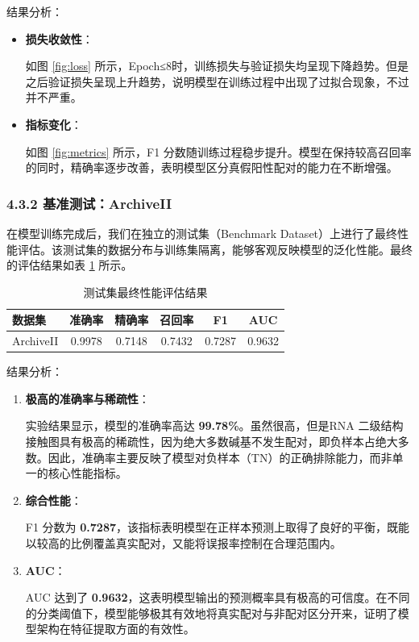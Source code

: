 \documentclass[a4paper,12pt]{article}
\begin{document}
结果分析：
\begin{itemize}
    \item \textbf{损失收敛性}：
    
    \hspace{2em}如图 \ref{fig:loss} 所示，Epoch≤8时，训练损失与验证损失均呈现下降趋势。但是之后验证损失呈现上升趋势，说明模型在训练过程中出现了过拟合现象，不过并不严重。
    \item \textbf{指标变化}：
    
    \hspace{2em}如图 \ref{fig:metrics} 所示，F1 分数随训练过程稳步提升。模型在保持较高召回率的同时，精确率逐步改善，表明模型区分真假阳性配对的能力在不断增强。
\end{itemize}

\subsubsection*{4.3.2 基准测试：ArchiveII}
\hspace{2em}在模型训练完成后，我们在独立的测试集（Benchmark Dataset）上进行了最终性能评估。该测试集的数据分布与训练集隔离，能够客观反映模型的泛化性能。最终的评估结果如表 \ref{tab:test_results} 所示。

\begin{table}[H]
    \centering
    \caption{测试集最终性能评估结果}
    \label{tab:test_results}
    \vspace{0.5em}
    \begin{tabular}{lccccc}
        \toprule
        \textbf{数据集} & \textbf{准确率} & \textbf{精确率} & \textbf{召回率} & \textbf{F1} & \textbf{AUC} \\
        \midrule
        ArchiveII & 0.9978 & 0.7148 & 0.7432 & 0.7287 & 0.9632 \\
        \bottomrule
    \end{tabular}
\end{table}

结果分析：
\begin{enumerate}
    \item \textbf{极高的准确率与稀疏性}：
    
    \hspace{2em}实验结果显示，模型的准确率高达 \textbf{99.78\%}。虽然很高，但是RNA 二级结构接触图具有极高的稀疏性，因为绝大多数碱基不发生配对，即负样本占绝大多数。因此，准确率主要反映了模型对负样本（TN）的正确排除能力，而非单一的核心性能指标。
    \item \textbf{综合性能}：
    
    \hspace{2em}F1 分数为 \textbf{0.7287}，该指标表明模型在正样本预测上取得了良好的平衡，既能以较高的比例覆盖真实配对，又能将误报率控制在合理范围内。
    \item \textbf{AUC}：
    
    \hspace{2em}AUC 达到了 \textbf{0.9632}，这表明模型输出的预测概率具有极高的可信度。在不同的分类阈值下，模型能够极其有效地将真实配对与非配对区分开来，证明了模型架构在特征提取方面的有效性。
\end{enumerate}
\end{document}
